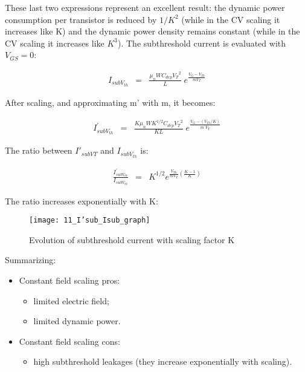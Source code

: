 \documentclass[a4paper, 12pt, twoside, openright]{report}
\begin{document}
\begin{enumerate}
These last two expressions represent an excellent result: the dynamic power consumption per transistor is reduced by $1/K^{2}$ (while in the CV scaling it increases like K) and the dynamic power density remains constant (while in the CV scaling it increases like $K^{3}$).
The subthreshold current is evaluated with $V_{GS} = 0$:

	\begin{eqnarray*}
	I_{subV_{th}} & = &\frac{\mu_n W C_{dep} {V_T}^2}{L}\;e^{\displaystyle \frac{ {V_G-V_{Th}}}{ mV_T}}
	\end{eqnarray*}

After scaling, and approximating m' with m, it becomes:

	\begin{eqnarray*}
	I_{subV_{th}}^{\prime} & = &\frac{K \mu_n W K^{1/2} C_{dep} {V_T}^2}{K L}\;e^{\displaystyle \frac{ {V_G-(V_{Th}/K)}}{ m^{\prime}V_T}}
	\end{eqnarray*}

The ratio between $I'_{subVT}$ and $I_{subV_{th}}$ is:

	\begin{eqnarray*}
	\frac{I_{subV_{th}}^{\prime}}{I_{subV_{th}}} & =& K^{1/2} e^{\frac{V_{Th}}{mV_T}\left( \frac{K-1}{K}\right)}
	\end{eqnarray*}

The ratio increases exponentially with K:

	\begin{figure}[H]
	\centering
	\texttt{[image: 11\_I'sub\_Isub\_graph]}
	\caption{Evolution of subthreshold current with scaling factor K}
	\label{}
	\end{figure}

Summarizing:

\begin{itemize}
\item Constant field scaling pros:
	\begin{itemize}
	\item limited electric field;
	\item limited dynamic power.
	\end{itemize}
\item Constant field scaling cons:
	\begin{itemize}
	\item high subthreshold leakages (they increase exponentially with scaling).
	\end{itemize}
\end{itemize}


\end{enumerate}
\end{document}
